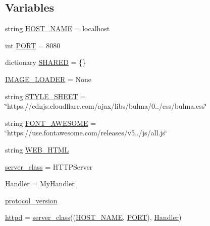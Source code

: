 \subsection*{Variables}
\begin{DoxyCompactItemize}
\item 
string \hyperlink{namespaceprojects_1_1personality__captions_1_1interactive_a324c28fe9be75fafe744744b14da1f3c}{H\+O\+S\+T\+\_\+\+N\+A\+ME} = \textquotesingle{}localhost\textquotesingle{}
\item 
int \hyperlink{namespaceprojects_1_1personality__captions_1_1interactive_ab05e4963da7495aff3b5537a9a4045c1}{P\+O\+RT} = 8080
\item 
dictionary \hyperlink{namespaceprojects_1_1personality__captions_1_1interactive_a7fafd85e5fa363c639429e78a32d4a1e}{S\+H\+A\+R\+ED} = \{\}
\item 
\hyperlink{namespaceprojects_1_1personality__captions_1_1interactive_a0cfa01e7e0553d70c9040b1ba3a5ab4c}{I\+M\+A\+G\+E\+\_\+\+L\+O\+A\+D\+ER} = None
\item 
string \hyperlink{namespaceprojects_1_1personality__captions_1_1interactive_ab50625ee40233850fac285551963e731}{S\+T\+Y\+L\+E\+\_\+\+S\+H\+E\+ET} = \char`\"{}https\+://cdnjs.\+cloudflare.\+com/ajax/libs/bulma/0../css/bulma.\+css\char`\"{}
\item 
string \hyperlink{namespaceprojects_1_1personality__captions_1_1interactive_a2e3f8d34763eaa4aba18a72ee794097c}{F\+O\+N\+T\+\_\+\+A\+W\+E\+S\+O\+ME} = \char`\"{}https\+://use.\+fontawesome.\+com/releases/v5../js/all.\+js\char`\"{}
\item 
string \hyperlink{namespaceprojects_1_1personality__captions_1_1interactive_a4c120f73f0044c8f7d0dcbda93f92ff0}{W\+E\+B\+\_\+\+H\+T\+ML}
\item 
\hyperlink{namespaceprojects_1_1personality__captions_1_1interactive_addcc3c9fe5ea6cea1c27b25747212851}{server\+\_\+class} = H\+T\+T\+P\+Server
\item 
\hyperlink{namespaceprojects_1_1personality__captions_1_1interactive_ae24fa5ef9665f775352eac9d6968713e}{Handler} = \hyperlink{classprojects_1_1personality__captions_1_1interactive_1_1MyHandler}{My\+Handler}
\item 
\hyperlink{namespaceprojects_1_1personality__captions_1_1interactive_aa1635234971b329d90a80ccbf388c3c3}{protocol\+\_\+version}
\item 
\hyperlink{namespaceprojects_1_1personality__captions_1_1interactive_ae631e34db5e50d6236da3b5b85427076}{httpd} = \hyperlink{namespaceprojects_1_1personality__captions_1_1interactive_addcc3c9fe5ea6cea1c27b25747212851}{server\+\_\+class}((\hyperlink{namespaceprojects_1_1personality__captions_1_1interactive_a324c28fe9be75fafe744744b14da1f3c}{H\+O\+S\+T\+\_\+\+N\+A\+ME}, \hyperlink{namespaceprojects_1_1personality__captions_1_1interactive_ab05e4963da7495aff3b5537a9a4045c1}{P\+O\+RT}), \hyperlink{namespaceprojects_1_1personality__captions_1_1interactive_ae24fa5ef9665f775352eac9d6968713e}{Handler})
\end{DoxyCompactItemize}


